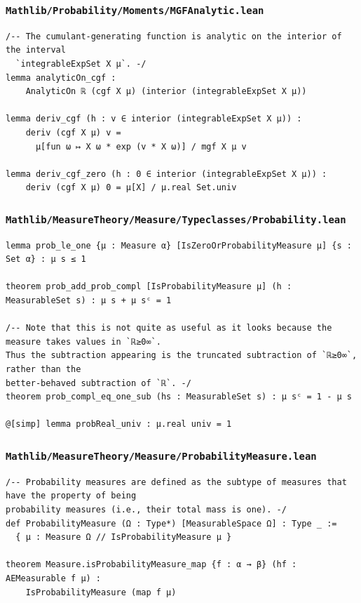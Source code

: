 \subsubsection{\texttt{Mathlib/Probability/Moments/MGFAnalytic.lean}}
\begin{lstlisting}[language=lean]
/-- The cumulant-generating function is analytic on the interior of the interval
  `integrableExpSet X μ`. -/
lemma analyticOn_cgf :
    AnalyticOn ℝ (cgf X μ) (interior (integrableExpSet X μ))

lemma deriv_cgf (h : v ∈ interior (integrableExpSet X μ)) :
    deriv (cgf X μ) v =
      μ[fun ω ↦ X ω * exp (v * X ω)] / mgf X μ v

lemma deriv_cgf_zero (h : 0 ∈ interior (integrableExpSet X μ)) :
    deriv (cgf X μ) 0 = μ[X] / μ.real Set.univ
\end{lstlisting}
\newpage

\subsubsection{\texttt{Mathlib/MeasureTheory/Measure/Typeclasses/Probability.lean}}
\begin{lstlisting}[language=lean]
lemma prob_le_one {μ : Measure α} [IsZeroOrProbabilityMeasure μ] {s : Set α} : μ s ≤ 1

theorem prob_add_prob_compl [IsProbabilityMeasure μ] (h : MeasurableSet s) : μ s + μ sᶜ = 1

/-- Note that this is not quite as useful as it looks because the measure takes values in `ℝ≥0∞`.
Thus the subtraction appearing is the truncated subtraction of `ℝ≥0∞`, rather than the
better-behaved subtraction of `ℝ`. -/
theorem prob_compl_eq_one_sub (hs : MeasurableSet s) : μ sᶜ = 1 - μ s

@[simp] lemma probReal_univ : μ.real univ = 1
\end{lstlisting}

\subsubsection{\texttt{Mathlib/MeasureTheory/Measure/ProbabilityMeasure.lean}}
\begin{lstlisting}[language=lean]
/-- Probability measures are defined as the subtype of measures that have the property of being
probability measures (i.e., their total mass is one). -/
def ProbabilityMeasure (Ω : Type*) [MeasurableSpace Ω] : Type _ :=
  { μ : Measure Ω // IsProbabilityMeasure μ }

theorem Measure.isProbabilityMeasure_map {f : α → β} (hf : AEMeasurable f μ) :
    IsProbabilityMeasure (map f μ)
\end{lstlisting}

